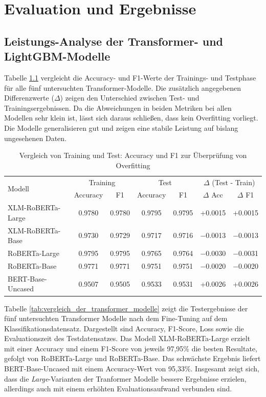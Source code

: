 \chapter{Evaluation und Ergebnisse}
\label{chap:evaluation_und_ergebnisse}

\section{Leistungs-Analyse der Transformer- und LightGBM-Modelle}

Tabelle \ref{tab:overfitting_check} vergleicht die Accuracy- und F1-Werte der Trainings- und Testphase für alle fünf untersuchten Transformer-Modelle. 
Die zusätzlich angegebenen Differenzwerte ($\Delta$) zeigen den Unterschied zwischen Test- und Trainingsergebnissen. 
Da die Abweichungen in beiden Metriken bei allen Modellen sehr klein ist, lässt sich daraus schließen, dass kein Overfitting vorliegt. 
Die Modelle generalisieren gut und zeigen eine stabile Leistung auf bislang ungesehenen Daten.

\begin{table}[ht]
\centering
\begin{tabular}{lcccccc}
    \toprule
    \multirow{2}{*}{Modell} & 
    \multicolumn{2}{c}{Training} & 
    \multicolumn{2}{c}{Test} & 
    \multicolumn{2}{c}{$\Delta$ (Test - Train)} \\
    \cmidrule(lr){2-3} \cmidrule(lr){4-5} \cmidrule(l){6-7}
    & Accuracy & F1 & Accuracy & F1 & $\Delta$ Acc & $\Delta$ F1 \\
    \midrule
    XLM-RoBERTa-Large   & 0.9780 & 0.9780 & 0.9795 & 0.9795 & +0.0015 & +0.0015 \\
    XLM-RoBERTa-Base    & 0.9730 & 0.9729 & 0.9717 & 0.9716 & $-$0.0013 & $-$0.0013 \\
    RoBERTa-Large       & 0.9795 & 0.9795 & 0.9765 & 0.9764 & $-$0.0030 & $-$0.0031 \\
    RoBERTa-Base        & 0.9771 & 0.9771 & 0.9751 & 0.9751 & $-$0.0020 & $-$0.0020 \\
    BERT-Base-Uncased   & 0.9507 & 0.9505 & 0.9533 & 0.9531 & +0.0026 & +0.0026 \\
    \bottomrule
\end{tabular}
\caption{Vergleich von Training und Test: Accuracy und F1 zur Überprüfung von Overfitting}
\label{tab:overfitting_check}
\end{table}

Tabelle \ref{tab:vergleich_der_transformer_modelle} zeigt die Testergebnisse der fünf untersuchten Transformer Modelle nach dem Fine-Tuning auf dem 
Klassifikationsdatensatz. 
Dargestellt sind Accuracy, F1-Score, Loss sowie die Evaluationszeit des Testdatensatzes. Das Modell XLM-RoBERTa-Large erzielt mit einer 
Accuracy und einem F1-Score von jeweils 97,95\% die besten Resultate, gefolgt von RoBERTa-Large und RoBERTa-Base. 
Das schwächste Ergebnis liefert BERT-Base-Uncased mit einem Accuracy-Wert von 95,33\%. Insgesamt zeigt sich, dass die \textit{Large}-Varianten
der Tranformer Modelle bessere Ergebnisse erzielen, allerdings auch mit einem erhöhten Evaluationsaufwand verbunden sind.

